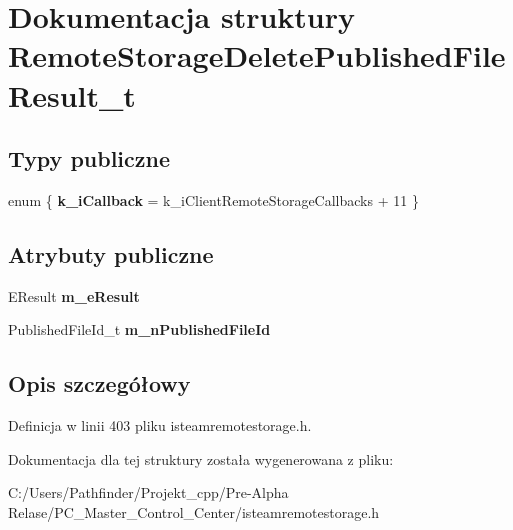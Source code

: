\hypertarget{struct_remote_storage_delete_published_file_result__t}{}\section{Dokumentacja struktury Remote\+Storage\+Delete\+Published\+File\+Result\+\_\+t}
\label{struct_remote_storage_delete_published_file_result__t}
\subsection*{Typy publiczne}
\begin{DoxyCompactItemize}
\item 
\mbox{\label{struct_remote_storage_delete_published_file_result__t_abc5ea85f8b8acf5cb28e0eedcb72bc74}} 
enum \{ {\bfseries k\+\_\+i\+Callback} = k\+\_\+i\+Client\+Remote\+Storage\+Callbacks + 11
 \}
\end{DoxyCompactItemize}
\subsection*{Atrybuty publiczne}
\begin{DoxyCompactItemize}
\item 
\mbox{\label{struct_remote_storage_delete_published_file_result__t_a035613bf612b162280e1fdcadfe89100}} 
E\+Result {\bfseries m\+\_\+e\+Result}
\item 
\mbox{\label{struct_remote_storage_delete_published_file_result__t_ad1b447d9d061d851358a0eb14bed2752}} 
Published\+File\+Id\+\_\+t {\bfseries m\+\_\+n\+Published\+File\+Id}
\end{DoxyCompactItemize}


\subsection{Opis szczegółowy}


Definicja w linii 403 pliku isteamremotestorage.\+h.



Dokumentacja dla tej struktury została wygenerowana z pliku\+:\begin{DoxyCompactItemize}
\item 
C\+:/\+Users/\+Pathfinder/\+Projekt\+\_\+cpp/\+Pre-\/\+Alpha Relase/\+P\+C\+\_\+\+Master\+\_\+\+Control\+\_\+\+Center/isteamremotestorage.\+h\end{DoxyCompactItemize}
